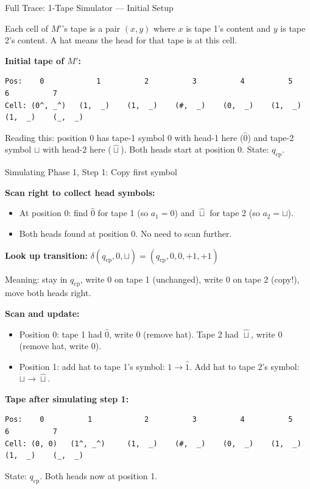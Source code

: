 \documentclass[11pt,a4paper]{article}
\begin{document}
\begin{examplebox}{{Full Trace: 1-Tape Simulator --- Initial Setup}}

Each cell of $M'$'s tape is a pair $(x, y)$ where $x$ is tape 1's content and $y$ is tape 2's content. A hat means the head for that tape is at this cell.

\textbf{Initial tape of $M'$:}
\begin{lstlisting}
Pos:    0            1          2          3          4          5          6          7
Cell: (0^, _^)   (1,  _)    (1,  _)    (#,  _)    (0,  _)    (1,  _)    (1,  _)    (_,  _)
\end{lstlisting}

Reading this: position 0 has tape-1 symbol $0$ with head-1 here ($\hat{0}$) and tape-2 symbol $\sqcup$ with head-2 here ($\hat{\sqcup}$). Both heads start at position 0. State: $q_{\text{cp}}$.
\end{examplebox}

\begin{examplebox}{{Simulating Phase 1, Step 1: Copy first symbol}}

\textbf{Scan right to collect head symbols:}
\begin{itemize}[nosep]
\item At position 0: find $\hat{0}$ for tape 1 (so $a_1 = 0$) and $\hat{\sqcup}$ for tape 2 (so $a_2 = \sqcup$).
\item Both heads found at position 0. No need to scan further.
\end{itemize}

\textbf{Look up transition:} $\delta(q_{\text{cp}}, 0, \sqcup) = (q_{\text{cp}}, 0, 0, +1, +1)$

Meaning: stay in $q_{\text{cp}}$, write $0$ on tape 1 (unchanged), write $0$ on tape 2 (copy!), move both heads right.

\textbf{Scan and update:}
\begin{itemize}[nosep]
\item Position 0: tape 1 had $\hat{0}$, write $0$ (remove hat). Tape 2 had $\hat{\sqcup}$, write $0$ (remove hat, write 0).
\item Position 1: add hat to tape 1's symbol: $1 \to \hat{1}$. Add hat to tape 2's symbol: $\sqcup \to \hat{\sqcup}$.
\end{itemize}

\textbf{Tape after simulating step 1:}
\begin{lstlisting}
Pos:    0          1            2          3          4          5          6          7
Cell: (0, 0)   (1^, _^)     (1,  _)    (#,  _)    (0,  _)    (1,  _)    (1,  _)    (_,  _)
\end{lstlisting}
State: $q_{\text{cp}}$. Both heads now at position 1.
\end{examplebox}
\end{document}
